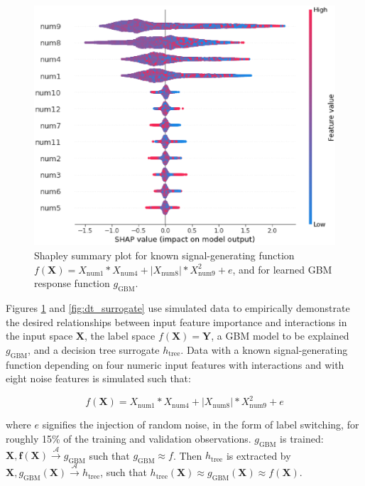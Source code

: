 \documentclass[sigconf, review]{acmart}
\begin{document}
\begin{figure}
	\begin{center}
		\includegraphics[scale=0.4]{img/figure_2.eps}
		\caption{Shapley summary plot for known signal-generating function $f(\mathbf{X}) = X_{\text{num}1} * X_{\text{num}4} + |X_{\text{num}8}| * X_{\text{num}9}^2 + e$, and for learned GBM response function $g_{\text{GBM}}$.}
		\label{fig:global_shapley}
	\end{center}
\end{figure}

Figures \ref{fig:global_shapley} and \ref{fig:dt_surrogate} use simulated data to empirically demonstrate the desired relationships between input feature importance and interactions in the input space $\mathbf{X}$, the label space $f(\mathbf{X}) = \mathbf{Y}$, a GBM model to be explained $g_{\text{GBM}}$, and a decision tree surrogate $h_{\text{tree}}$. Data with a known signal-generating function depending on four numeric input features with interactions and with eight noise features is simulated such that: 

\begin{equation}
\label{eq:f}
f(\mathbf{X}) = X_{\text{num}1} * X_{\text{num}4} + |X_{\text{num}8}| * X_{\text{num}9}^2 + e
\end{equation}

\noindent where $e$ signifies the injection of random noise, in the form of label switching, for roughly 15\% of the training and validation observations. $g_{\text{GBM}}$ is trained: $ \mathbf{X}, \mathbf{f(X)} \xrightarrow{\mathcal{A}} g_{\text{GBM}}$ such that $g_{\text{GBM}} \approx f$. Then $h_{\text{tree}}$ is extracted by $\mathbf{X}, g_{\text{GBM}}(\mathbf{X}) \xrightarrow{\mathcal{A}} h_{\text{tree}}$, such that $h_{\text{tree}}(\mathbf{X}) \approx g_{\text{GBM}}(\mathbf{X}) \approx f(\mathbf{X})$.
\end{document}
